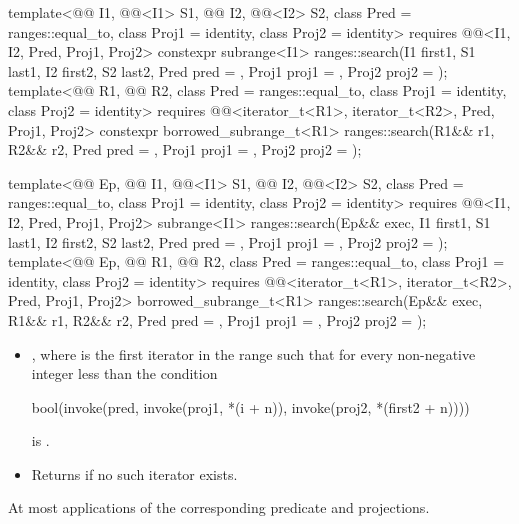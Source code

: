 %
\begin{itemdecl}
template<@@ I1, @@<I1> S1, @@ I2,
         @@<I2> S2, class Pred = ranges::equal_to,
         class Proj1 = identity, class Proj2 = identity>
  requires @@<I1, I2, Pred, Proj1, Proj2>
  constexpr subrange<I1>
    ranges::search(I1 first1, S1 last1, I2 first2, S2 last2, Pred pred = {},
                   Proj1 proj1 = {}, Proj2 proj2 = {});
template<@@ R1, @@ R2, class Pred = ranges::equal_to,
         class Proj1 = identity, class Proj2 = identity>
  requires @@<iterator_t<R1>, iterator_t<R2>, Pred, Proj1, Proj2>
  constexpr borrowed_subrange_t<R1>
    ranges::search(R1&& r1, R2&& r2, Pred pred = {},
                   Proj1 proj1 = {}, Proj2 proj2 = {});

template<@@ Ep, @@ I1, @@<I1> S1,
         @@ I2, @@<I2> S2,
         class Pred = ranges::equal_to, class Proj1 = identity, class Proj2 = identity>
  requires @@<I1, I2, Pred, Proj1, Proj2>
  subrange<I1>
    ranges::search(Ep&& exec, I1 first1, S1 last1, I2 first2, S2 last2,
                   Pred pred = {}, Proj1 proj1 = {}, Proj2 proj2 = {});
template<@@ Ep, @@ R1, @@ R2,
         class Pred = ranges::equal_to, class Proj1 = identity, class Proj2 = identity>
  requires @@<iterator_t<R1>, iterator_t<R2>, Pred, Proj1, Proj2>
  borrowed_subrange_t<R1>
    ranges::search(Ep&& exec, R1&& r1, R2&& r2,
                   Pred pred = {}, Proj1 proj1 = {}, Proj2 proj2 = {});
\end{itemdecl}

\begin{itemdescr}
\pnum
\returns
\begin{itemize}
\item
  ,
  where  is
  the first iterator in the range 
  such that
  for every non-negative integer  less than 
  the condition
\begin{codeblock}
bool(invoke(pred, invoke(proj1, *(i + n)), invoke(proj2, *(first2 + n))))
\end{codeblock}
  is .
\item
  Returns  if no such iterator exists.
\end{itemize}

\pnum
\complexity
At most  applications
of the corresponding predicate and projections.
\end{itemdescr}

